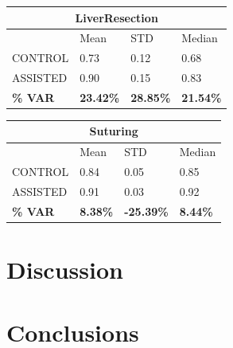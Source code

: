 \documentclass{article}
\begin{document}
\begin{multicols}{2}
\begin{center}
\begin{tabularx}{\linewidth}{| X | X | X | X |}
\hline
\multicolumn{4}{||c||}{\textbf{LiverResection}} \\
\hline\hline
 & Mean & STD & Median \\
\hline
CONTROL & 0.73 & 0.12 & 0.68 \\
\hline
ASSISTED & 0.90 & 0.15 & 0.83 \\
\hline
\textbf{\% VAR} & \textbf{23.42\%} & \textbf{28.85\%} & \textbf{21.54\%} \\
\hline
\end{tabularx}
\end{center}

\begin{center}
\begin{tabularx}{\linewidth}{| X | X | X | X |}
\hline
\multicolumn{4}{||c||}{\textbf{Suturing}} \\
\hline\hline
 & Mean & STD & Median \\
\hline
CONTROL & 0.84 & 0.05 & 0.85 \\
\hline
ASSISTED & 0.91 & 0.03 & 0.92 \\
\hline
\textbf{\% VAR} & \textbf{8.38\%} & \textbf{-25.39\%} & \textbf{8.44\%} \\
\hline
\end{tabularx}
\end{center}
\section{Discussion}
\section{Conclusions}


\end{multicols}
\end{document}
